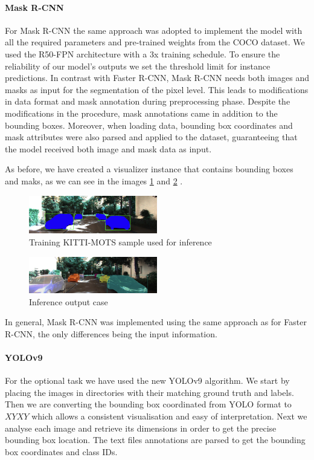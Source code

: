 \documentclass{IEEEtran}
\begin{document}
	\paragraph{Mask R-CNN}
	For Mask R-CNN the same approach was adopted to implement the model with all the required parameters and pre-trained weights from the COCO dataset. We used the R50-FPN architecture with a 3x training schedule. To ensure the reliability of our model's outputs we set the threshold limit for instance predictions. In contrast with Faster R-CNN, Mask R-CNN needs both images and masks as input for the segmentation of the pixel level. This leads to modifications in data format and mask annotation during preprocessing phase. Despite the modifications in the procedure, mask annotations came in addition to the bounding boxes. Moreover, when loading data, bounding box coordinates and mask attributes were also parsed and applied to the dataset, guaranteeing that the model received both image and mask data as input.
	
	As before, we have created a visualizer instance that contains bounding boxes and maks, as we can see in the images \ref{fig:mask_sample} and \ref{fig:mask_interf_output}  . 
	
	\begin{figure}[htbp]
		\centering
		\includegraphics[width=0.5\textwidth]{images/mask_sample.png} 
		\caption{Training KITTI-MOTS sample used for inference}
		\label{fig:mask_sample}
	\end{figure}
	
	\begin{figure}[htbp]
		\centering
		\includegraphics[width=0.5\textwidth]{images/mask_interf_output.png} 
		\caption{Inference output case}
		\label{fig:mask_interf_output}
	\end{figure}
	
	In general, Mask R-CNN was implemented using the same approach as for Faster R-CNN, the only differences being the input information.
	
	\paragraph{YOLOv9}
	For the optional task we have used the new YOLOv9 algorithm. We start by placing the images in directories with their matching ground truth and labels. Then we are converting the bounding box coordinated from YOLO format to $XYXY$ which allows a consistent visualisation and easy of interpretation. Next we analyse each image and retrieve its dimensions in order to get the precise bounding box location. The text files annotations are parsed to get the bounding box coordinates and class IDs. 
	
\end{document}
